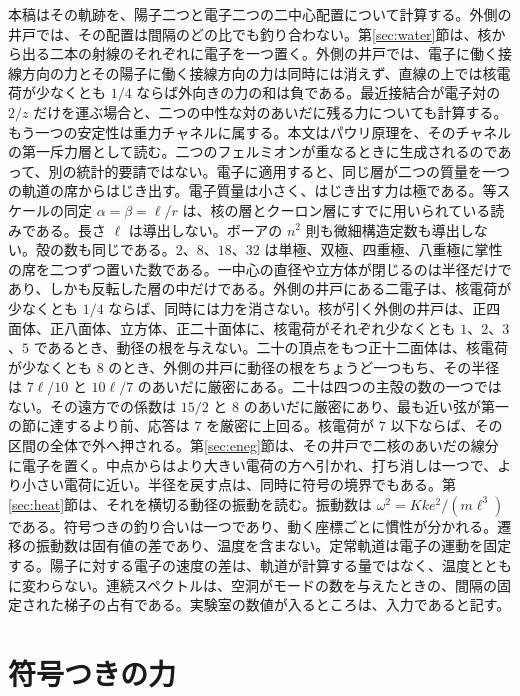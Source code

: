 \documentclass[a4paper]{article}
\begin{document}
本稿はその軌跡を、陽子二つと電子二つの二中心配置について計算する。外側の井戸では、その配置は間隔のどの比でも釣り合わない。第\ref{sec:water}節は、核から出る二本の射線のそれぞれに電子を一つ置く。外側の井戸では、電子に働く接線方向の力とその陽子に働く接線方向の力は同時には消えず、直線の上では核電荷が少なくとも \(1/4\) ならば外向きの力の和は負である。最近接結合が電子対の \(2/z\) だけを運ぶ場合と、二つの中性な対のあいだに残る力についても計算する。もう一つの安定性は重力チャネルに属する。本文はパウリ原理を、そのチャネルの第一斥力層として読む。二つのフェルミオンが重なるときに生成されるのであって、別の統計的要請ではない。電子に適用すると、同じ層が二つの質量を一つの軌道の席からはじき出す。電子質量は小さく、はじき出す力は極である。等スケールの同定 \(\alpha=\beta=\ell/r\) は、核の層とクーロン層にすでに用いられている読みである。長さ \(\ell\) は導出しない。ボーアの \(n^{2}\) 則も微細構造定数も導出しない。殻の数も同じである。\(2\)、\(8\)、\(18\)、\(32\) は単極、双極、四重極、八重極に掌性の席を二つずつ置いた数である。一中心の直径や立方体が閉じるのは半径だけであり、しかも反転した層の中だけである。外側の井戸にある二電子は、核電荷が少なくとも \(1/4\) ならば、同時には力を消さない。核が引く外側の井戸は、正四面体、正八面体、立方体、正二十面体に、核電荷がそれぞれ少なくとも \(1\)、\(2\)、\(3\)、\(5\) であるとき、動径の根を与えない。二十の頂点をもつ正十二面体は、核電荷が少なくとも \(8\) のとき、外側の井戸に動径の根をちょうど一つもち、その半径は \(7\ell/10\) と \(10\ell/7\) のあいだに厳密にある。二十は四つの主殻の数の一つではない。その遠方での係数は \(15/2\) と \(8\) のあいだに厳密にあり、最も近い弦が第一の節に達するより前、応答は \(7\) を厳密に上回る。核電荷が \(7\) 以下ならば、その区間の全体で外へ押される。第\ref{sec:eneg}節は、その井戸で二核のあいだの線分に電子を置く。中点からはより大きい電荷の方へ引かれ、打ち消しは一つで、より小さい電荷に近い。半径を戻す点は、同時に符号の境界でもある。第\ref{sec:heat}節は、それを横切る動径の振動を読む。振動数は \(\omega^{2}=K k e^{2}/(m\ell^{3})\) である。符号つきの釣り合いは一つであり、動く座標ごとに慣性が分かれる。遷移の振動数は固有値の差であり、温度を含まない。定常軌道は電子の運動を固定する。陽子に対する電子の速度の差は、軌道が計算する量ではなく、温度とともに変わらない。連続スペクトルは、空洞がモードの数を与えたときの、間隔の固定された梯子の占有である。実験室の数値が入るところは、入力であると記す。

\section{符号つきの力}
\label{sec:force}
\end{document}

